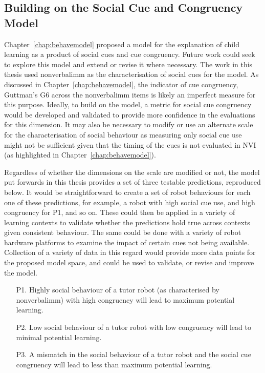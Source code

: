 \subsection{Building on the Social Cue and Congruency Model}
Chapter~\ref{chap:behavemodel} proposed a model for the explanation of child \gls{learning} as a product of social cues and cue congruency. Future work could seek to explore this model and extend or revise it where necessary. The work in this thesis used \gls{nonverbalimm} as the characterisation of social cues for the model. As discussed in Chapter~\ref{chap:behavemodel}, the indicator of cue congruency, Guttman's G6 across the \gls{nonverbalimm} items is likely an imperfect measure for this purpose. Ideally, to build on the model, a metric for social cue congruency would be developed and validated to provide more confidence in the evaluations for this dimension. It may also be necessary to modify or use an alternate scale for the characterisation of social behaviour as measuring only social cue use might not be sufficient given that the timing of the cues is not evaluated in NVI (as highlighted in Chapter~\ref{chap:behavemodel}).

Regardless of whether the dimensions on the scale are modified or not, the model put forwards in this thesis provides a set of three testable predictions, reproduced below. It would be straightforward to create a set of robot behaviours for each one of these predictions, for example, a robot with high social cue use, and high congruency for P1, and so on. These could then be applied in a variety of learning contexts to validate whether the predictions hold true across contexts given consistent behaviour. The same could be done with a variety of robot hardware platforms to examine the impact of certain cues not being available. Collection of a variety of data in this regard would provide more data points for the proposed model space, and could be used to validate, or revise and improve the model.
\begin{enumerate}
	\item [P1.] Highly social behaviour of a tutor robot (as characterised by \gls{nonverbalimm}) with high congruency will lead to maximum potential \gls{learning}.
	\item [P2.] Low social behaviour of a tutor robot with low congruency will lead to minimal potential \gls{learning}.
	\item [P3.] A mismatch in the social behaviour of a tutor robot and the social cue congruency will lead to less than maximum potential \gls{learning}.
\end{enumerate}

